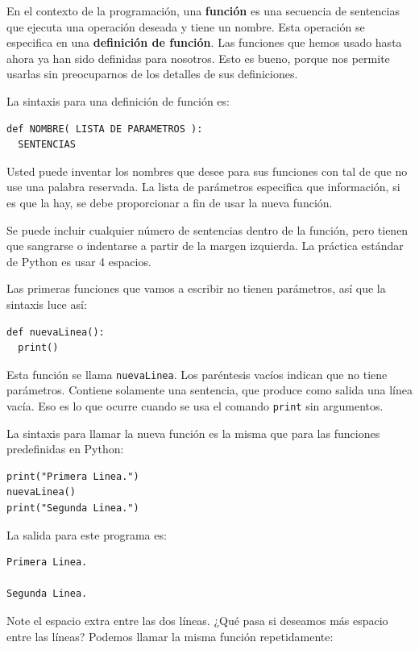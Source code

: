En el contexto de la programación, una \textbf{función} es una secuencia
de sentencias que ejecuta una operación deseada y tiene un nombre.
Esta operación se especifica en una \textbf{definición de función}.
Las funciones que hemos usado hasta ahora ya han sido definidas para
nosotros. Esto es bueno, porque nos permite usarlas sin preocuparnos
de los detalles de sus definiciones.

  

La sintaxis para una definición de función es:

\begin{lstlisting}
def NOMBRE( LISTA DE PARAMETROS ):
  SENTENCIAS
\end{lstlisting}
 Usted puede inventar los nombres que desee para sus funciones con
tal de que no use una palabra reservada. La lista de parámetros especifica
que información, si es que la hay, se debe proporcionar a fin de usar
la nueva función.

Se puede incluir cualquier número de sentencias dentro de la función,
pero tienen que sangrarse o indentarse a partir de la margen izquierda.
La práctica estándar de Python es usar 4 espacios.

Las primeras funciones que vamos a escribir no tienen parámetros,
así que la sintaxis luce así:

\begin{lstlisting}
def nuevaLinea():
  print()
\end{lstlisting}
 Esta función se llama \texttt{nuevaLinea}. Los paréntesis vacíos
indican que no tiene parámetros. Contiene solamente una sentencia,
que produce como salida una línea vacía. Eso es lo que ocurre cuando
se usa el comando \texttt{print} sin argumentos.

La sintaxis para llamar la nueva función es la misma que para las
funciones predefinidas en Python:

\begin{lstlisting}
print("Primera Linea.")
nuevaLinea()
print("Segunda Linea.")
\end{lstlisting}
 La salida para este programa es:
\begin{verbatim}
Primera Linea.

Segunda Linea.
\end{verbatim}
Note el espacio extra entre las dos líneas. ¿Qué pasa si deseamos
más espacio entre las líneas? Podemos llamar la misma función repetidamente:

